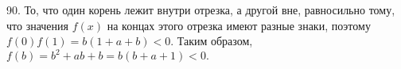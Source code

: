 90. То, что один корень лежит внутри отрезка, а другой вне, равносильно тому, что значения $f(x)$ на концах этого отрезка имеют разные знаки, поэтому $f(0)f(1)=b(1+a+b)<0.$ Таким образом, $f(b)=b^2+ab+b=b(b+a+1)<0.$\\
